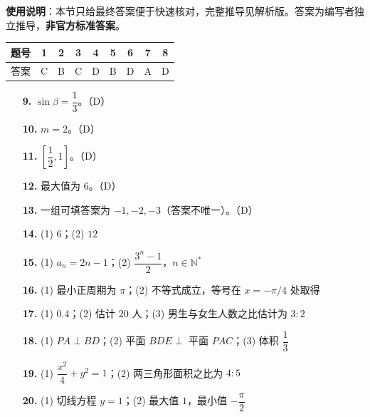 
\begin{gknotice}
\textbf{使用说明}：本节只给最终答案便于快速核对，完整推导见解析版。答案为编写者独立推导，\textbf{非官方标准答案}。
\end{gknotice}

\begin{center}\begin{tabular}{ccccccccc}
\toprule
题号 & 1 & 2 & 3 & 4 & 5 & 6 & 7 & 8 \\
\midrule
答案 & C & B & C & D & B & D & A & D \\
\bottomrule
\end{tabular}\end{center}

\begin{itemize}[leftmargin=2.6em]
  \item[\textbf{9.}] $\sin\beta=\dfrac13$。（D）
  \item[\textbf{10.}] $m=2$。（D）
  \item[\textbf{11.}] $\left[\dfrac12,1\right]$。（D）
  \item[\textbf{12.}] 最大值为 $6$。（D）
  \item[\textbf{13.}] 一组可填答案为 $-1,-2,-3$（答案不唯一）。（D）
  \item[\textbf{14.}] (1) $6$；(2) $12$
\end{itemize}

\begin{itemize}[leftmargin=2.6em]
  \item[\textbf{15.}] (1) $a_n=2n-1$；(2) $\dfrac{3^n-1}{2}$，$n\in\mathbb N^*$
  \item[\textbf{16.}] (1) 最小正周期为 $\pi$；(2) 不等式成立，等号在 $x=-\pi/4$ 处取得
  \item[\textbf{17.}] (1) $0.4$；(2) 估计 20 人；(3) 男生与女生人数之比估计为 $3:2$
  \item[\textbf{18.}] (1) $PA\perp BD$；(2) 平面 $BDE\perp$ 平面 $PAC$；(3) 体积 $\dfrac13$
  \item[\textbf{19.}] (1) $\dfrac{x^2}{4}+y^2=1$；(2) 两三角形面积之比为 $4:5$
  \item[\textbf{20.}] (1) 切线方程 $y=1$；(2) 最大值 $1$，最小值 $-\dfrac\pi2$
\end{itemize}
